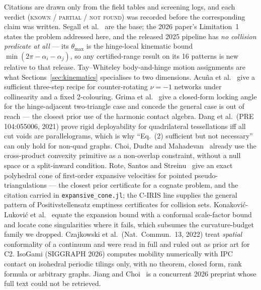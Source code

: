 \documentclass[11pt,a4paper]{article}
\theoremstyle{definition}
\newcommand{\file}[1]{\texttt{\small #1}}
\begin{document}
Citations are drawn only from the field tables and screening logs, and each verdict
(\textsc{known} / \textsc{partial} / \textsc{not found}) was recorded before the corresponding
claim was written. Segall et al.~\cite{Segall2025,Segall2026} are the base; the 2026 paper's
Limitation~1 states the problem addressed here, and the released 2025 pipeline has \emph{no
collision predicate at all} --- its $\theta_{\max}$ is the hinge-local kinematic bound
$\min(2\pi-\alpha_i-\alpha_j)$, so any certified-range result on its 16 patterns is new
relative to that release. Tay--Whiteley body-and-hinge motion assignments are what
Sections~\ref{sec:kinematics} specialises to two dimensions. Acu\~na et
al.~\cite{Acuna2022} give a sufficient three-step recipe for counter-rotating $\nu=-1$
networks under collinearity and a fixed 2-colouring. Grima et al.~\cite{Grima2012} give a
closed-form locking angle for the hinge-adjacent two-triangle case and concede the general case
is out of reach --- the closest prior use of the harmonic contact algebra. Dang et al.\ (PRE
104:055006, 2021) prove rigid deployability for quadrilateral tessellations iff all cut voids
are parallelograms, which is why ``Eq.~(2) sufficient but not necessary'' can only hold for
non-quad graphs. Choi, Dudte and Mahadevan~\cite{Choi2019} already use the cross-product
convexity primitive as a non-overlap constraint, without a null space or a split-inward
condition. Rote, Santos and Streinu~\cite{Rote2003} give an exact polyhedral cone of
first-order expansive velocities for pointed pseudo-triangulations --- the closest prior
certificate for a cognate problem, and the citation carried in
\file{expansive\_cone.jl}; the C-IRIS line supplies the general pattern of
Positivstellensatz emptiness certificates for collision sets. Konakovi\'c-Lukovi\'c et
al.~\cite{Konakovic2018} equate the expansion bound with a conformal scale-factor bound and
locate cone singularities where it fails, which subsumes the curvature-budget family we
dropped. Czajkowski et al.\ (Nat.\ Commun.\ 13, 2022) treat \emph{spatial} conformality of a
continuum and were read in full and ruled out as prior art for C2. IsoGami (SIGGRAPH 2026)
computes mobility numerically with IPC contact on isohedral periodic tilings only, with no
theorem, closed form, rank formula or arbitrary graphs. Jiang and Choi~\cite{Jiang2026} is a
concurrent 2026 preprint whose full text could not be retrieved.




\clearpage
\appendix
\end{document}
